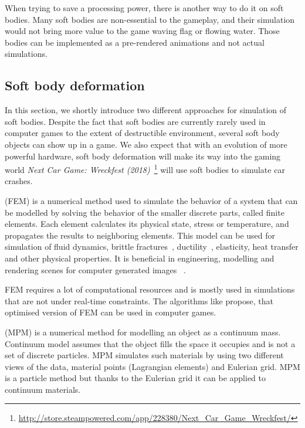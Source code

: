 When trying to save a processing power, there is another way to do it on soft bodies. Many soft bodies are non-essential to the gameplay, and their simulation would not bring more value to the game \eg waving flag or flowing water. Those bodies can be implemented as a pre-rendered animations and not actual simulations.

\subsection{Soft body deformation}
In this section, we shortly introduce two different approaches for simulation of soft bodies. Despite the fact that soft bodies are currently rarely used in computer games to the extent of destructible environment, several soft body objects can show up in a game. We also expect that with an evolution of more powerful hardware, soft body deformation will make its way into the gaming world \eg \emph{Next Car Game: Wreckfest (2018)}~\footnote{\url{http://store.steampowered.com/app/228380/Next\_Car\_Game\_Wreckfest/}} will use soft bodies to simulate car crashes.
\label{sec:softBody}

 (FEM) is a numerical method used to simulate the behavior of a system that can be modelled by solving the behavior of the smaller discrete parts, called finite elements. Each element calculates its physical state, \eg stress or temperature, and propagates the results to neighboring elements. This model can be used for simulation of fluid dynamics, brittle fractures~\cite{brittlefracture}, ductility~\cite{ductilefracture}, elasticity, heat transfer and other physical properties. It is beneficial in engineering, modelling and rendering scenes for computer generated images ~\cite{Bargteil:2007:AFE}. 

FEM requires a lot of computational resources and is mostly used in simulations that are not under real-time constraints. The algorithms like \citet{femingames} propose, that optimised version of FEM can be used in computer games.


 (MPM) is a numerical method for modelling an object as a continuum mass. Continuum model assumes that the object fills the space it occupies and is not a set of discrete particles. MPM simulates such materials by using two different views of the data, material points (Lagrangian elements) and Eulerian grid. MPM is a particle method but thanks to the Eulerian grid it can be applied to continuum materials. 

